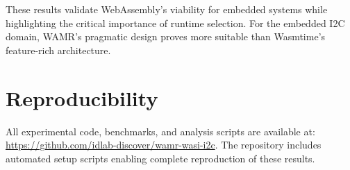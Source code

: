 These results validate WebAssembly's viability for embedded systems while highlighting the critical importance of runtime selection. For the embedded I2C domain, WAMR's pragmatic design proves more suitable than Wasmtime's feature-rich architecture.

\section*{Reproducibility}
All experimental code, benchmarks, and analysis scripts are available at: \url{https://github.com/idlab-discover/wamr-wasi-i2c}. The repository includes automated setup scripts enabling complete reproduction of these results.